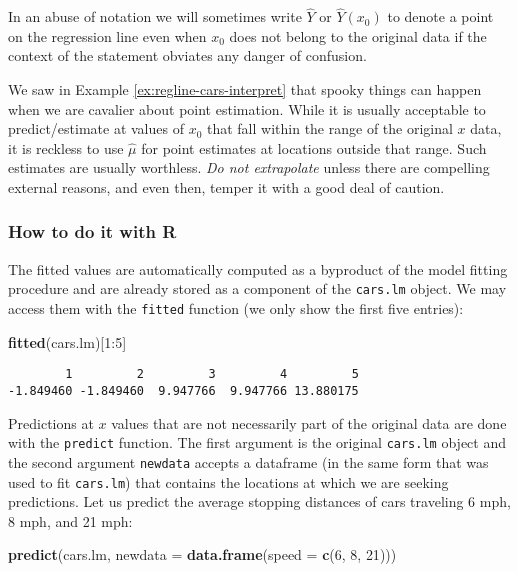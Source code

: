 \documentclass[]{book}
\newenvironment{Shaded}{\begin{snugshade}}{\end{snugshade}}
\newcommand{\KeywordTok}[1]{\textcolor[rgb]{0.13,0.29,0.53}{\textbf{{#1}}}}
\newcommand{\DataTypeTok}[1]{\textcolor[rgb]{0.13,0.29,0.53}{{#1}}}
\newcommand{\DecValTok}[1]{\textcolor[rgb]{0.00,0.00,0.81}{{#1}}}
\newcommand{\NormalTok}[1]{{#1}}
\numberwithin{equation}{chapter}
\numberwithin{figure}{chapter}
\theoremstyle{plain}
\theoremstyle{definition}
\theoremstyle{remark}
\theoremstyle{definition}
\theoremstyle{definition}
\theoremstyle{remark}
\begin{document}
In an abuse of notation we will sometimes write \(\hat{Y}\) or
\(\hat{Y}(x_{0})\) to denote a point on the regression line even when
\(x_{0}\) does not belong to the original data if the context of the
statement obviates any danger of confusion.

We saw in Example \ref{ex:regline-cars-interpret} that spooky things can
happen when we are cavalier about point estimation. While it is usually
acceptable to predict/estimate at values of \(x_{0}\) that fall within
the range of the original \(x\) data, it is reckless to use
\(\hat{\mu}\) for point estimates at locations outside that range. Such
estimates are usually worthless. \emph{Do not extrapolate} unless there
are compelling external reasons, and even then, temper it with a good
deal of caution.

\subsubsection{How to do it with R}\label{how-to-do-it-with-r-48}

The fitted values are automatically computed as a byproduct of the model
fitting procedure and are already stored as a component of the
\texttt{cars.lm} object. We may access them with the \texttt{fitted}
function (we only show the first five entries):

\begin{Shaded}
\begin{Highlighting}[]
\KeywordTok{fitted}\NormalTok{(cars.lm)[}\DecValTok{1}\NormalTok{:}\DecValTok{5}\NormalTok{]}
\end{Highlighting}
\end{Shaded}

\begin{verbatim}
        1         2         3         4         5 
-1.849460 -1.849460  9.947766  9.947766 13.880175 
\end{verbatim}

Predictions at \(x\) values that are not necessarily part of the
original data are done with the \texttt{predict} function. The first
argument is the original \texttt{cars.lm} object and the second argument
\texttt{newdata} accepts a dataframe (in the same form that was used to
fit \texttt{cars.lm}) that contains the locations at which we are
seeking predictions. Let us predict the average stopping distances of
cars traveling 6 mph, 8 mph, and 21 mph:

\begin{Shaded}
\begin{Highlighting}[]
\KeywordTok{predict}\NormalTok{(cars.lm, }\DataTypeTok{newdata =} \KeywordTok{data.frame}\NormalTok{(}\DataTypeTok{speed =} \KeywordTok{c}\NormalTok{(}\DecValTok{6}\NormalTok{, }\DecValTok{8}\NormalTok{, }\DecValTok{21}\NormalTok{)))}
\end{Highlighting}
\end{Shaded}
\end{document}
